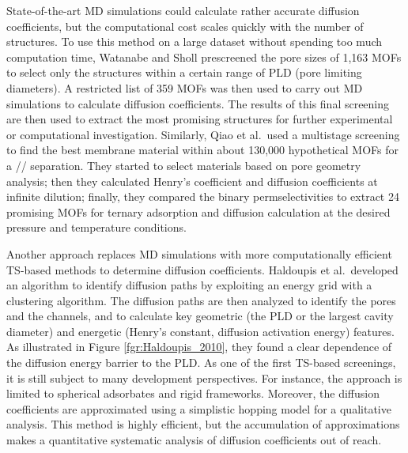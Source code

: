 \documentclass[main.tex]{subfiles}
\begin{document}
State-of-the-art MD simulations could calculate rather accurate diffusion coefficients, but the computational cost scales quickly with the number of structures. To use this method on a large dataset without spending too much computation time, Watanabe and Sholl prescreened the pore sizes of 1,163 MOFs to select only the structures within a certain range of PLD (pore limiting diameters).\cite{Watanabe_2012} A restricted list of 359 MOFs was then used to carry out MD simulations to calculate diffusion coefficients. The results of this final screening are then used to extract the most promising structures for further experimental or computational investigation. Similarly, Qiao et al.\ used a multistage screening to find the best membrane material within about 130,000 hypothetical MOFs for a // separation.\cite{Qiao_2016} They started to select materials based on pore geometry analysis; then they calculated Henry's coefficient and diffusion coefficients at infinite dilution; finally, they compared the binary permselectivities to extract 24 promising MOFs for ternary adsorption and diffusion calculation at the desired pressure and temperature conditions.

Another approach replaces MD simulations with more computationally efficient TS-based methods to determine diffusion coefficients.
Haldoupis et al.\ developed an algorithm to identify diffusion paths by exploiting an energy grid with a clustering algorithm. The diffusion paths are then analyzed to identify the pores and the channels, and to calculate key geometric (the PLD or the largest cavity diameter) and energetic (Henry's constant, diffusion activation energy) features.\cite{Haldoupis_2010}
As illustrated in Figure \ref{fgr:Haldoupis_2010}, they found a clear dependence of the diffusion energy barrier to the PLD. As one of the first TS-based screenings, it is still subject to many development perspectives. For instance, the approach is limited to spherical adsorbates and rigid frameworks. Moreover, the diffusion coefficients are approximated using a simplistic hopping model for a qualitative analysis. This method is highly efficient, but the accumulation of approximations makes a quantitative systematic analysis of diffusion coefficients out of reach.
\end{document}
